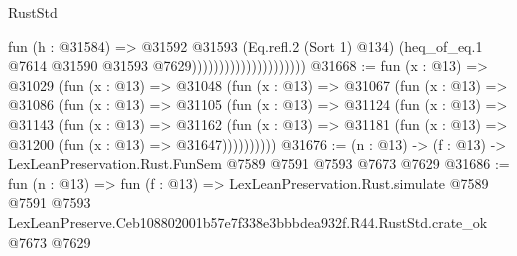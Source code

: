 \begin{lexlean}{RustStd}
\begin{coremodule}
                                          fun (h : @31584) =>
                                          @31592
                                            @31593
                                            (Eq.refl.{2} (Sort 1) @134)
                                            (heq_of_eq.{1}
                                              @7614
                                              @31590
                                              @31593
                                              @7629)))))))))))))))))))))
@31668 := fun (x : @13) =>
  @31029
    (fun (x : @13) =>
    @31048
      (fun (x : @13) =>
      @31067
        (fun (x : @13) =>
        @31086
          (fun (x : @13) =>
          @31105
            (fun (x : @13) =>
            @31124
              (fun (x : @13) =>
              @31143
                (fun (x : @13) =>
                @31162
                  (fun (x : @13) =>
                  @31181 (fun (x : @13) => @31200 (fun (x : @13) => @31647))))))))))
@31676 := (n : @13) -> (f : @13) -> LexLeanPreservation.Rust.FunSem @7589 @7591 @7593 @7673 @7629
@31686 := fun (n : @13) =>
  fun (f : @13) =>
  LexLeanPreservation.Rust.simulate
    @7589
    @7591
    @7593
    LexLeanPreserve.Ceb108802001b57e7f338e3bbbdea932f.R44.RustStd.crate_ok
    @7673
    @7629
\end{coremodule}
\end{lexlean}
